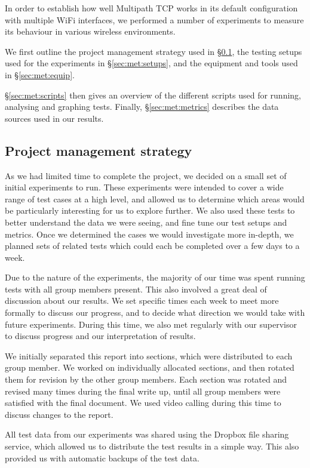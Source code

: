 In order to establish how well Multipath TCP works in its default configuration
with multiple WiFi interfaces, we performed a number of experiments to
measure its behaviour in various wireless environments.

We first outline the project management strategy used in \S\ref{sec:met:pm}, 
the testing setups used for the experiments in \S\ref{sec:met:setups}, 
and the equipment and tools used in \S\ref{sec:met:equip}.

\S\ref{sec:met:scripts} then gives an overview of the different scripts used for
running, analysing and graphing tests. Finally, \S\ref{sec:met:metrics}
describes the data sources used in our results.

\subsection{Project management strategy}
\label{sec:met:pm}
As we had limited time to complete the project, we decided on a small set
of initial experiments to run. These experiments were intended
to cover a wide range of test cases at a high level, and allowed us to determine
which areas would be particularly interesting for us to explore further.
We also used these tests to better understand the data we were seeing, and
fine tune our test setups and metrics. Once we determined the cases we would
investigate more in-depth, we planned sets of related tests which could
each be completed over a few days to a week.

Due to the nature of the experiments, the majority of our time was spent
running tests with all group members present. This also involved a great
deal of discussion about our results. We set specific times each week to
meet more formally to discuss our progress, and to decide what direction we would
take with future experiments. During this time, we also met regularly with
our supervisor to discuss progress and our interpretation of results.

We initially separated this report into sections, which were distributed to
each group member. We worked on individually allocated sections, and
then rotated them  for revision by the other group members. Each section was
rotated and revised many times during the final write up, until all group members
were satisfied with the final document. We used video calling during this time
to discuss changes to the report.

All test data from our experiments was shared using the Dropbox file sharing
service, which allowed us to distribute the test results in a simple way. This also
provided us with automatic backups of the test data.


